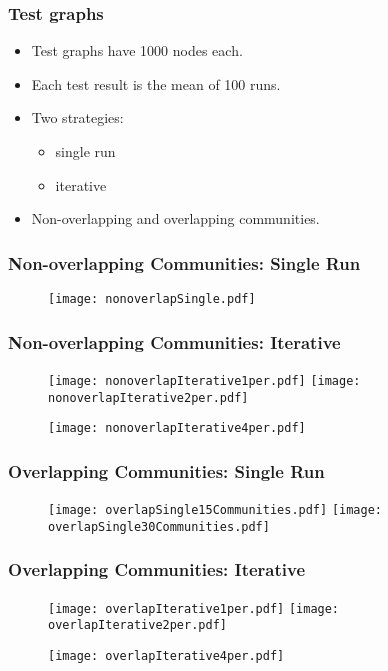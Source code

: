 \documentclass[xcolor=table]{beamer}
\begin{document}
\begin{frame}[t]
\frametitle{Test graphs}
\begin{itemize}
    \item Test graphs have 1000 nodes each.
    \item Each test result is the mean of 100 runs.
    \item Two strategies: 
        \begin{itemize}
            \item single run
            \item iterative
        \end{itemize}
    \item Non-overlapping and overlapping communities.
\end{itemize}
\end{frame}

\begin{frame}[t]
\frametitle{Non-overlapping Communities: Single Run}
\vspace{-5mm}
\begin{figure}[ht]
    \centering
        \texttt{[image: nonoverlapSingle.pdf]}
\end{figure}
\end{frame}

\begin{frame}[t]
\frametitle{Non-overlapping Communities: Iterative}
\begin{figure}[ht]
    \centering
        \texttt{[image: nonoverlapIterative1per.pdf]} 
            \hfill
        \texttt{[image: nonoverlapIterative2per.pdf]} \\
    
        \begin{center}
            \texttt{[image: nonoverlapIterative4per.pdf]}
        \end{center}
\end{figure}
\end{frame}

\begin{frame}[t]
\frametitle{Overlapping Communities: Single Run}
\begin{figure}[ht]
    \centering
        \texttt{[image: overlapSingle15Communities.pdf]}
        \hfill
        \texttt{[image: overlapSingle30Communities.pdf]}
\end{figure}
\end{frame}

\begin{frame}[t]
\frametitle{Overlapping Communities: Iterative}
\begin{figure}[ht]
    \centering
        \texttt{[image: overlapIterative1per.pdf]} 
            \hfill
        \texttt{[image: overlapIterative2per.pdf]} \\
    
        \begin{center}
            \texttt{[image: overlapIterative4per.pdf]}
        \end{center}
\end{figure}
\end{frame}
\end{document}
